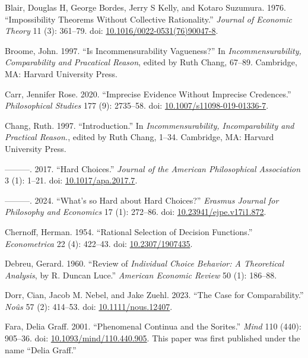 \documentclass[
  11pt,
  letterpaper,
  DIV=11,
  numbers=noendperiod,
  twoside]{scrartcl}
\newlength{\cslhangindent}
\newenvironment{CSLReferences}[2] %
 {\begin{list}{}{%
  \setlength{\itemindent}{0pt}
  \setlength{\leftmargin}{0pt}
  \setlength{\parsep}{0pt}
  \ifodd #1
   \setlength{\leftmargin}{\cslhangindent}
   \setlength{\itemindent}{-1\cslhangindent}
  \fi
  \setlength{\itemsep}{#2\baselineskip}}}
 {\end{list}}
\begin{document}
\begin{CSLReferences}{1}{0}
Blair, Douglas H, George Bordes, Jerry S Kelly, and Kotaro Suzumura.
1976. {``Impossibility Theorems Without Collective Rationality.''}
\emph{Journal of Economic Theory} 11 (3): 361--79. doi:
\href{https://doi.org/10.1016/0022-0531(76)90047-8}{10.1016/0022-0531(76)90047-8}.

Broome, John. 1997. {``Is Incommensurability Vagueness?''} In
\emph{Incommensurability, Comparability and Pracatical Reason}, edited
by Ruth Chang, 67--89. Cambridge, MA: Harvard University Press.

Carr, Jennifer Rose. 2020. {``Imprecise Evidence Without Imprecise
Credences.''} \emph{Philosophical Studies} 177 (9): 2735--58. doi:
\href{https://doi.org/10.1007/s11098-019-01336-7}{10.1007/s11098-019-01336-7}.

Chang, Ruth. 1997. {``Introduction.''} In \emph{Incommensurability,
Incomparability and Practical Reason.}, edited by Ruth Chang, 1--34.
Cambridge, MA: Harvard University Press.

---------. 2017. {``Hard Choices.''} \emph{Journal of the American
Philosophical Association} 3 (1): 1--21. doi:
\href{https://doi.org/10.1017/apa.2017.7}{10.1017/apa.2017.7}.

---------. 2024. {``What's so Hard about Hard Choices?''} \emph{Erasmus
Journal for Philosophy and Economics} 17 (1): 272--86. doi:
\href{https://doi.org/10.23941/ejpe.v17i1.872}{10.23941/ejpe.v17i1.872}.

Chernoff, Herman. 1954. {``Rational Selection of Decision Functions.''}
\emph{Econometrica} 22 (4): 422--43. doi:
\href{https://doi.org/10.2307/1907435}{10.2307/1907435}.

Debreu, Gerard. 1960. {``Review of \emph{Individual Choice Behavior: A
Theoretical Analysis}, by {R. Duncan Luce}.''} \emph{American Economic
Review} 50 (1): 186--88.

Dorr, Cian, Jacob M. Nebel, and Jake Zuehl. 2023. {``The Case for
Comparability.''} \emph{Noûs} 57 (2): 414--53. doi:
\href{https://doi.org/10.1111/nous.12407}{10.1111/nous.12407}.

Fara, Delia Graff. 2001. {``Phenomenal Continua and the Sorites.''}
\emph{Mind} 110 (440): 905--36. doi:
\href{https://doi.org/10.1093/mind/110.440.905}{10.1093/mind/110.440.905}.
This paper was first published under the name {``Delia Graff.''}


\end{CSLReferences}
\end{document}
